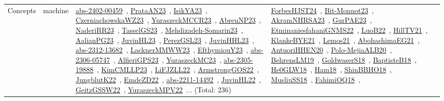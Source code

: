{\begin{longtable}{lp{3cm}>{\raggedright\arraybackslash}p{6cm}>{\raggedright\arraybackslash}p{6cm}>{\raggedright\arraybackslash}p{8cm}}
Concepts & machine & \href{works/abs-2402-00459.pdf}{abs-2402-00459}~\cite{abs-2402-00459}, \href{works/PrataAN23.pdf}{PrataAN23}~\cite{PrataAN23}, \href{works/IsikYA23.pdf}{IsikYA23}~\cite{IsikYA23}, \href{works/CzerniachowskaWZ23.pdf}{CzerniachowskaWZ23}~\cite{CzerniachowskaWZ23}, \href{works/YuraszeckMCCR23.pdf}{YuraszeckMCCR23}~\cite{YuraszeckMCCR23}, \href{works/AbreuNP23.pdf}{AbreuNP23}~\cite{AbreuNP23}, \href{works/NaderiRR23.pdf}{NaderiRR23}~\cite{NaderiRR23}, \href{works/TasselGS23.pdf}{TasselGS23}~\cite{TasselGS23}, \href{works/Mehdizadeh-Somarin23.pdf}{Mehdizadeh-Somarin23}~\cite{Mehdizadeh-Somarin23}, \href{works/AalianPG23.pdf}{AalianPG23}~\cite{AalianPG23}, \href{works/JuvinHL23.pdf}{JuvinHL23}~\cite{JuvinHL23}, \href{works/PerezGSL23.pdf}{PerezGSL23}~\cite{PerezGSL23}, \href{works/JuvinHHL23.pdf}{JuvinHHL23}~\cite{JuvinHHL23}, \href{works/abs-2312-13682.pdf}{abs-2312-13682}~\cite{abs-2312-13682}, \href{works/LacknerMMWW23.pdf}{LacknerMMWW23}~\cite{LacknerMMWW23}, \href{works/EfthymiouY23.pdf}{EfthymiouY23}~\cite{EfthymiouY23}, \href{works/abs-2306-05747.pdf}{abs-2306-05747}~\cite{abs-2306-05747}, \href{works/AlfieriGPS23.pdf}{AlfieriGPS23}~\cite{AlfieriGPS23}, \href{works/YuraszeckMC23.pdf}{YuraszeckMC23}~\cite{YuraszeckMC23}, \href{works/abs-2305-19888.pdf}{abs-2305-19888}~\cite{abs-2305-19888}, \href{works/KimCMLLP23.pdf}{KimCMLLP23}~\cite{KimCMLLP23}, \href{works/LiFJZLL22.pdf}{LiFJZLL22}~\cite{LiFJZLL22}, \href{works/ArmstrongGOS22.pdf}{ArmstrongGOS22}~\cite{ArmstrongGOS22}, \href{works/JungblutK22.pdf}{JungblutK22}~\cite{JungblutK22}, \href{works/EmdeZD22.pdf}{EmdeZD22}~\cite{EmdeZD22}, \href{works/abs-2211-14492.pdf}{abs-2211-14492}~\cite{abs-2211-14492}, \href{works/JuvinHL22.pdf}{JuvinHL22}~\cite{JuvinHL22}, \href{works/GeitzGSSW22.pdf}{GeitzGSSW22}~\cite{GeitzGSSW22}, \href{works/YuraszeckMPV22.pdf}{YuraszeckMPV22}~\cite{YuraszeckMPV22}... (Total: 236) & \href{works/ForbesHJST24.pdf}{ForbesHJST24}~\cite{ForbesHJST24}, \href{works/Bit-Monnot23.pdf}{Bit-Monnot23}~\cite{Bit-Monnot23}, \href{works/AkramNHRSA23.pdf}{AkramNHRSA23}~\cite{AkramNHRSA23}, \href{works/GurPAE23.pdf}{GurPAE23}~\cite{GurPAE23}, \href{works/EtminaniesfahaniGNMS22.pdf}{EtminaniesfahaniGNMS22}~\cite{EtminaniesfahaniGNMS22}, \href{works/LuoB22.pdf}{LuoB22}~\cite{LuoB22}, \href{works/HillTV21.pdf}{HillTV21}~\cite{HillTV21}, \href{works/KlankeBYE21.pdf}{KlankeBYE21}~\cite{KlankeBYE21}, \href{works/Lemos21.pdf}{Lemos21}~\cite{Lemos21}, \href{works/AbohashimaEG21.pdf}{AbohashimaEG21}~\cite{AbohashimaEG21}, \href{works/AntuoriHHEN20.pdf}{AntuoriHHEN20}~\cite{AntuoriHHEN20}, \href{works/Polo-MejiaALB20.pdf}{Polo-MejiaALB20}~\cite{Polo-MejiaALB20}, \href{works/BehrensLM19.pdf}{BehrensLM19}~\cite{BehrensLM19}, \href{works/GoldwaserS18.pdf}{GoldwaserS18}~\cite{GoldwaserS18}, \href{works/BaptisteB18.pdf}{BaptisteB18}~\cite{BaptisteB18}, \href{works/He0GLW18.pdf}{He0GLW18}~\cite{He0GLW18}, \href{works/Ham18.pdf}{Ham18}~\cite{Ham18}, \href{works/ShinBBHO18.pdf}{ShinBBHO18}~\cite{ShinBBHO18}, \href{works/MusliuSS18.pdf}{MusliuSS18}~\cite{MusliuSS18}, \href{works/FahimiOQ18.pdf}{FahimiOQ18}~\cite{FahimiOQ18}, 
\end{longtable}}
